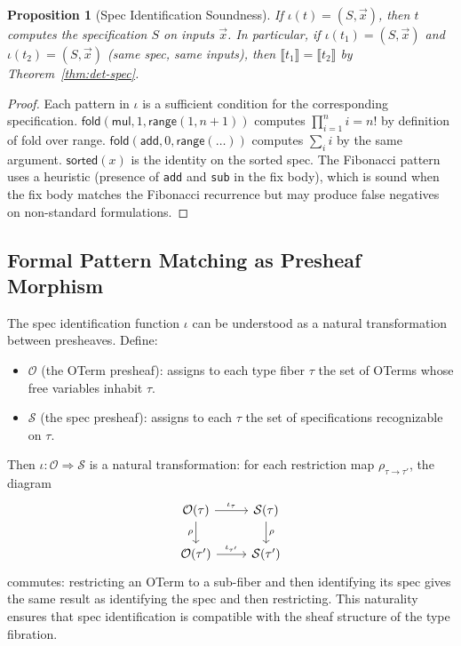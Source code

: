 \documentclass[11pt,a4paper]{report}
\theoremstyle{definition}
\theoremstyle{plain}
\newtheorem{proposition}[definition]{Proposition}
\newcommand{\den}[1]{\llbracket #1 \rrbracket}
\newcommand{\fold}{\mathsf{fold}}
\begin{document}
\begin{proposition}[Spec Identification Soundness]
\label{prop:spec-id-sound}
If $\iota(t) = (S, \vec{x})$, then $t$ computes the specification
$S$ on inputs $\vec{x}$.  In particular, if $\iota(t_1) = (S, \vec{x})$
and $\iota(t_2) = (S, \vec{x})$ (same spec, same inputs), then
$\den{t_1} = \den{t_2}$ by Theorem~\ref{thm:det-spec}.
\end{proposition}

\begin{proof}
Each pattern in $\iota$ is a sufficient condition for the
corresponding specification.
$\fold(\mathsf{mul}, 1, \mathsf{range}(1, n{+}1))$ computes
$\prod_{i=1}^n i = n!$ by definition of fold over range.
$\fold(\mathsf{add}, 0, \mathsf{range}(\ldots))$ computes
$\sum_{i} i$ by the same argument.
$\mathsf{sorted}(x)$ is the identity on the sorted spec.
The Fibonacci pattern uses a heuristic (presence of \texttt{add}
and \texttt{sub} in the fix body), which is sound when the fix
body matches the Fibonacci recurrence but may produce false
negatives on non-standard formulations.
\end{proof}


\subsection{Formal Pattern Matching as Presheaf Morphism}

The spec identification function $\iota$ can be understood as a
natural transformation between presheaves.  Define:
\begin{itemize}
  \item $\mathcal{O}$ (the OTerm presheaf): assigns to each type
    fiber $\tau$ the set of OTerms whose free variables inhabit
    $\tau$.
  \item $\mathcal{S}$ (the spec presheaf): assigns to each $\tau$
    the set of specifications recognizable on $\tau$.
\end{itemize}

Then $\iota : \mathcal{O} \Rightarrow \mathcal{S}$ is a natural
transformation: for each restriction map $\rho_{\tau \to \tau'}$,
the diagram
\[
  \begin{tikzcd}
    \mathcal{O}(\tau) \ar[r, "\iota_\tau"] \ar[d, "\rho"'] &
    \mathcal{S}(\tau) \ar[d, "\rho"] \\
    \mathcal{O}(\tau') \ar[r, "\iota_{\tau'}"] &
    \mathcal{S}(\tau')
  \end{tikzcd}
\]
commutes: restricting an OTerm to a sub-fiber and then identifying
its spec gives the same result as identifying the spec and then
restricting.  This naturality ensures that spec identification
is compatible with the sheaf structure of the type fibration.
\end{document}
